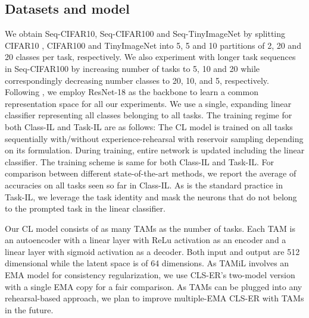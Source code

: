 \documentclass{article} %
\begin{document}
\subsection{Datasets and model}
We obtain Seq-CIFAR10, Seq-CIFAR100 and Seq-TinyImageNet by splitting CIFAR10 \citep{krizhevsky2009learning}, CIFAR100 \citep{krizhevsky2009learning} and TinyImageNet \citep{le2015tiny} into 5, 5 and 10 partitions of 2, 20 and 20 classes per task, respectively. We also experiment with longer task sequences in Seq-CIFAR100 by increasing number of tasks to 5, 10 and 20 while correspondingly decreasing number classes to 20, 10, and 5, respectively. 
 Following \cite{arani2022learning, buzzega2020dark, cha2021co2l, caccia2021new}, we employ ResNet-18 \citep{he2016deep} as the backbone to learn a common representation space for all our experiments. We use a single, expanding linear classifier representing all classes belonging to all tasks. The training regime for both Class-IL and Task-IL are as follows: The CL model is trained on all tasks sequentially with/without experience-rehearsal with reservoir sampling depending on its formulation. During training, entire network is updated including the linear classifier. The training scheme is same for both Class-IL and Task-IL. For comparison between different state-of-the-art methods, we report the average of accuracies on all tasks seen so far in Class-IL. As is the standard practice in Task-IL, we leverage the task identity and mask the neurons that do not belong to the prompted task in the linear classifier.  

Our CL model consists of as many TAMs as the number of tasks. Each TAM is an autoencoder with a linear layer with ReLu activation as an encoder and a linear layer with sigmoid activation as a decoder. Both input and output are 512 dimensional while the latent space is of 64 dimensions. As TAMiL involves an EMA model for consistency regularization, we use CLS-ER's two-model version with a single EMA copy for a fair comparison. As TAMs can be plugged into any rehearsal-based approach, we plan to improve multiple-EMA CLS-ER with TAMs in the future. 
\end{document}
